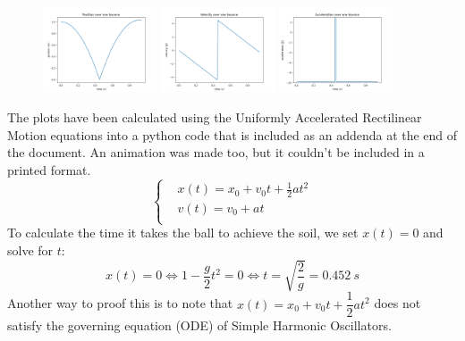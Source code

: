 \documentclass{report}
\begin{document}
  \begin{figure}[h]
    \centering
    \includegraphics[width=0.3\textwidth]{fotos/position.png}
    \includegraphics[width=0.3\textwidth]{fotos/velocity.png}
    \includegraphics[width=0.3\textwidth]{fotos/acceleration.png}
  \end{figure}

  \noindent The plots have been calculated using the Uniformly Accelerated Rectilinear Motion equations into a python code that is included as an addenda at the end of the document. An animation was made too, but it couldn't be included in a printed format.
  \begin{equation}
    \left\{\begin{aligned}
      &x(t)=x_0+v_0t+\frac{1}{2}at^2\\
      &v(t)=v_0+at\\
    \end{aligned}\right.
  \end{equation}
  \noindent To calculate the time it takes the ball to achieve the soil, we set $x(t)=0$ and solve for $t$:
  \[x(t)=0\Longleftrightarrow 1-\frac{g}{2}t^2=0 \Longleftrightarrow t=\sqrt{\frac{2}{g}}=0.452\ s\]
  \noindent Another way to proof this is to note that $x(t)=x_0+v_0t+\dfrac12 at^2$ does not satisfy the governing equation (ODE) of Simple Harmonic Oscillators.
  
\end{document}
